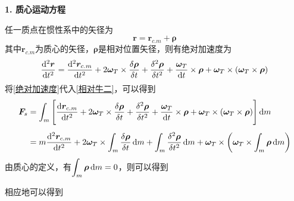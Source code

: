 	\textbf{1. 质心运动方程}
	
	任一质点在惯性系中的矢径为
	\begin{equation}
		\bm{r} = \bm{r}_{c.m} + \bm{\rho}
	\end{equation}
	其中$\bm{r}_{c.m}$为质心的矢径，$\bm{\rho}$是相对位置矢径，则有绝对加速度为
	\begin{equation}
		\dfrac{{\rm{d}}^2 \bm{r}}{{\rm{d}} t^2} = \dfrac{{\rm{d}}^2 \bm{r}_{c.m}}{{\rm{d}} t^2} + 2 \bm{\omega}_T \times \dfrac{\delta \bm{\rho}}{\delta t} + \dfrac{\delta^2 \bm{\rho}}{\delta t^2} + \dfrac{\bm{\omega}_T}{{\rm{d}} t}\times \bm{\rho} + \bm{\omega}_T \times (\bm{\omega}_T \times \bm{\rho}) 
		\label{绝对加速度}
	\end{equation}
	将\eqref{绝对加速度}代入\eqref{相对牛二}，可以得到
	\begin{align*}
		\bm{F}_s & = \int_m \Bigg[\dfrac{{\rm{d}} \bm{r}_{c.m}}{{\rm{d}} t^2} + 2 \bm{\omega}_T \times \dfrac{\delta \bm{\rho}}{\delta t} + \dfrac{\delta^2 \bm{\rho}}{\delta t^2} + \dfrac{\bm{\omega}_T}{{\rm{d}} t}\times \bm{\rho} + \bm{\omega}_T \times (\bm{\omega}_T \times \bm{\rho}) \Bigg]\,{\rm{d}} m \\[0.5em]
		& = m \dfrac{{\rm{d}}^2 \bm{r}_{c.m}}{{\rm{d}} t^2} + 2 \bm{\omega}_T \times \int_m \dfrac{\delta \bm{\rho}}{\delta t}\, {\rm{d}} m + \int_m \dfrac{\delta^2 \bm{\rho}}{\delta t^2}\, {\rm{d}} m + \bm{\omega}_T \times \left(\bm{\omega}_T \times \int_m \bm{\rho}\, {\rm{d}} m \right)
	\end{align*}
由质心的定义，有$\displaystyle \int_m \bm{\rho} \, {\rm{d}} m = 0$，则可以得到


\noindent 相应地可以得到


